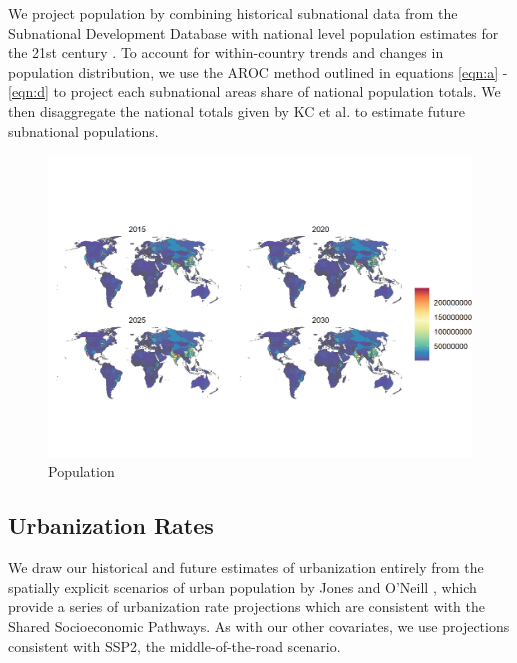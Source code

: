 \documentclass{article}
\begin{document}
We project population by combining historical subnational data from the Subnational Development Database \citep{Smits2019} with national level population estimates for the 21st century \citep{KC2017}.  To account for within-country trends and changes in population distribution, we use the AROC method outlined in equations \ref{eqn:a} - \ref{eqn:d} to project each subnational areas share of national population totals. We then disaggregate the national totals given by KC et al. to estimate future subnational populations.

\begin{figure}[H]
  \centering
  \includegraphics[width=\linewidth]{img/covars/population.png}
  \caption{Population}
\end{figure}

\pagebreak
\subsection{Urbanization Rates}

We draw our historical and future estimates of urbanization entirely from the spatially explicit scenarios of urban population by Jones and O'Neill \citep{Jones2016}, which provide a series of urbanization rate projections which are consistent with the Shared Socioeconomic Pathways.  As with our other covariates, we use projections consistent with SSP2, the middle-of-the-road scenario. 
\end{document}
